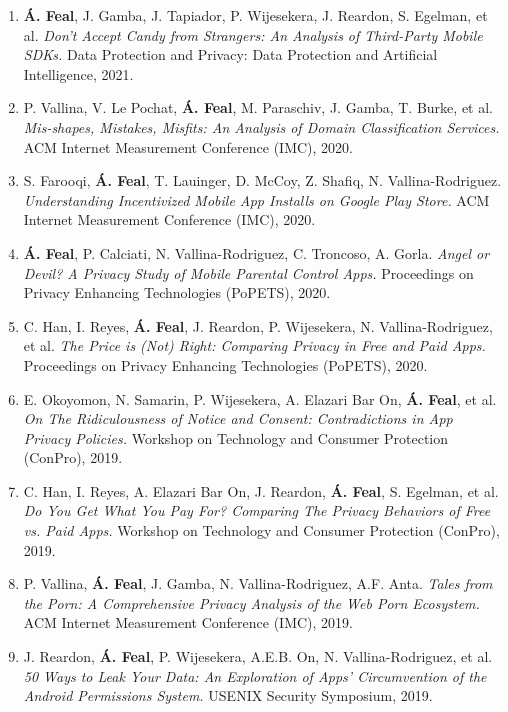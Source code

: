\documentclass[11pt,a4paper,sans]{moderncv}        %
\begin{document}
\begin{enumerate}
\item \textbf{Á. Feal}, J. Gamba, J. Tapiador, P. Wijesekera, J. Reardon, S. Egelman, et al. \textit{Don't Accept Candy from Strangers: An Analysis of Third-Party Mobile SDKs.} Data Protection and Privacy: Data Protection and Artificial Intelligence, 2021.

\item P. Vallina, V. Le Pochat, \textbf{Á. Feal}, M. Paraschiv, J. Gamba, T. Burke, et al. \textit{Mis-shapes, Mistakes, Misfits: An Analysis of Domain Classification Services.} ACM Internet Measurement Conference (IMC), 2020.

\item S. Farooqi, \textbf{Á. Feal}, T. Lauinger, D. McCoy, Z. Shafiq, N. Vallina-Rodriguez. \textit{Understanding Incentivized Mobile App Installs on Google Play Store.} ACM Internet Measurement Conference (IMC), 2020.

\item \textbf{Á. Feal}, P. Calciati, N. Vallina-Rodriguez, C. Troncoso, A. Gorla. \textit{Angel or Devil? A Privacy Study of Mobile Parental Control Apps.} Proceedings on Privacy Enhancing Technologies (PoPETS), 2020.

\item C. Han, I. Reyes, \textbf{Á. Feal}, J. Reardon, P. Wijesekera, N. Vallina-Rodriguez, et al. \textit{The Price is (Not) Right: Comparing Privacy in Free and Paid Apps.} Proceedings on Privacy Enhancing Technologies (PoPETS), 2020.

\item E. Okoyomon, N. Samarin, P. Wijesekera, A. Elazari Bar On, \textbf{Á. Feal}, et al. \textit{On The Ridiculousness of Notice and Consent: Contradictions in App Privacy Policies.} Workshop on Technology and Consumer Protection (ConPro), 2019.

\item C. Han, I. Reyes, A. Elazari Bar On, J. Reardon, \textbf{Á. Feal}, S. Egelman, et al. \textit{Do You Get What You Pay For? Comparing The Privacy Behaviors of Free vs. Paid Apps.} Workshop on Technology and Consumer Protection (ConPro), 2019.

\item P. Vallina, \textbf{Á. Feal}, J. Gamba, N. Vallina-Rodriguez, A.F. Anta. \textit{Tales from the Porn: A Comprehensive Privacy Analysis of the Web Porn Ecosystem.} ACM Internet Measurement Conference (IMC), 2019.

\item J. Reardon, \textbf{Á. Feal}, P. Wijesekera, A.E.B. On, N. Vallina-Rodriguez, et al. \textit{50 Ways to Leak Your Data: An Exploration of Apps' Circumvention of the Android Permissions System.} USENIX Security Symposium, 2019.
\end{enumerate}
\end{document}
